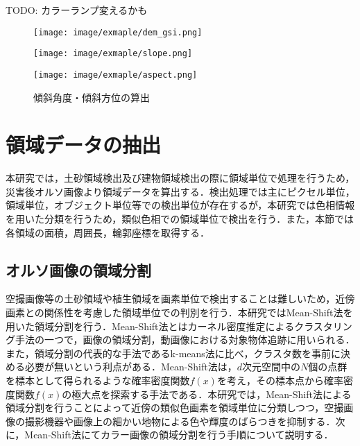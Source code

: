       TODO: カラーランプ変えるかも
      \begin{figure}[t]
        \begin{minipage}[c]{0.3\hsize}
          \centering
          \texttt{[image: image/exmaple/dem\_gsi.png]}
          \label{入力DEM}
        \end{minipage}
        \begin{minipage}[c]{0.3\hsize}
          \centering
          \texttt{[image: image/exmaple/slope.png]}
          \label{傾斜角度図}
        \end{minipage}
        \begin{minipage}[c]{0.3\hsize}
          \centering
          \texttt{[image: image/exmaple/aspect.png]}
          \label{傾斜方位図}
        \end{minipage}
        \caption{傾斜角度・傾斜方位の算出}
      \end{figure}


  \section{領域データの抽出}
    本研究では，土砂領域検出及び建物領域検出の際に領域単位で処理を行うため，災害後オルソ画像より領域データを算出する．検出処理では主にピクセル単位，領域単位，オブジェクト単位等での検出単位が存在するが，本研究では色相情報を用いた分類を行うため，類似色相での領域単位で検出を行う．また，本節では各領域の面積，周囲長，輪郭座標を取得する．

    \subsection{オルソ画像の領域分割}
      \label{オルソ画像の領域分割}
      空撮画像等の土砂領域や植生領域を画素単位で検出することは難しいため，近傍画素との関係性を考慮した領域単位での判別を行う．本研究ではMean-Shift法\cite{Mean-Shift法1, Mean-Shift法2}を用いた領域分割を行う．Mean-Shift法とはカーネル密度推定によるクラスタリング手法の一つで，画像の領域分割，動画像における対象物体追跡に用いられる．また，領域分割の代表的な手法であるk-means法\cite{k-means法}に比べ，クラスタ数を事前に決める必要が無いという利点がある．Mean-Shift法は，$d$次元空間中の$N$個の点群を標本として得られるような確率密度関数$f(x)$を考え，その標本点から確率密度関数$f(x)$の極大点を探索する手法である．本研究では，Mean-Shift法による領域分割を行うことによって近傍の類似色画素を領域単位に分類しつつ，空撮画像の撮影機器や画像上の細かい地物による色や輝度のばらつきを抑制する．次に，Mean-Shift法にてカラー画像の領域分割を行う手順について説明する．

